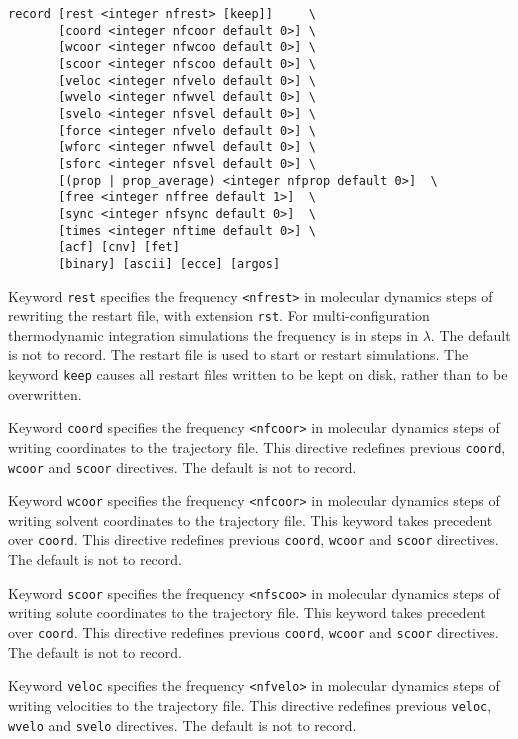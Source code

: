 \begin{description}

\item
\begin{verbatim}
record [rest <integer nfrest> [keep]]     \
       [coord <integer nfcoor default 0>] \
       [wcoor <integer nfwcoo default 0>] \
       [scoor <integer nfscoo default 0>] \
       [veloc <integer nfvelo default 0>] \
       [wvelo <integer nfwvel default 0>] \
       [svelo <integer nfsvel default 0>] \
       [force <integer nfvelo default 0>] \
       [wforc <integer nfwvel default 0>] \
       [sforc <integer nfsvel default 0>] \
       [(prop | prop_average) <integer nfprop default 0>]  \
       [free <integer nffree default 1>]  \
       [sync <integer nfsync default 0>]  \
       [times <integer nftime default 0>] \
       [acf] [cnv] [fet]
       [binary] [ascii] [ecce] [argos]
\end{verbatim}

Keyword \verb+rest+
specifies the frequency \verb+<nfrest>+ in molecular dynamics steps
of rewriting the restart file, with extension \verb+rst+. 
For multi-configuration
thermodynamic integration simulations the frequency is in
steps in $\lambda$. The default is not to record. The restart
file is used to start or restart simulations. The keyword {\tt keep}
causes all restart files written to be kept on disk, rather than
to be overwritten.

Keyword \verb+coord+
specifies the frequency \verb+<nfcoor>+ in molecular dynamics steps
of writing coordinates to the trajectory file. This directive redefines
previous \verb+coord+, \verb+wcoor+ and \verb+scoor+
directives. The default is not to record.

Keyword \verb+wcoor+
specifies the frequency \verb+<nfcoor>+ in molecular dynamics steps
of writing solvent coordinates to the trajectory file. This keyword
takes precedent over \verb+coord+. This directive redefines
previous \verb+coord+, \verb+wcoor+ and \verb+scoor+
directives. 
The default is not to record.

Keyword \verb+scoor+
specifies the frequency \verb+<nfscoo>+ in molecular dynamics steps
of writing solute coordinates to the trajectory file. This keyword
takes precedent over \verb+coord+. This directive redefines
previous \verb+coord+, \verb+wcoor+ and \verb+scoor+
directives. 
The default is not to record.

Keyword \verb+veloc+
specifies the frequency \verb+<nfvelo>+ in molecular dynamics steps
of writing velocities to the trajectory file. This directive redefines
previous \verb+veloc+, \verb+wvelo+ and \verb+svelo+
directives. 
The default is not to record.


\end{description}
